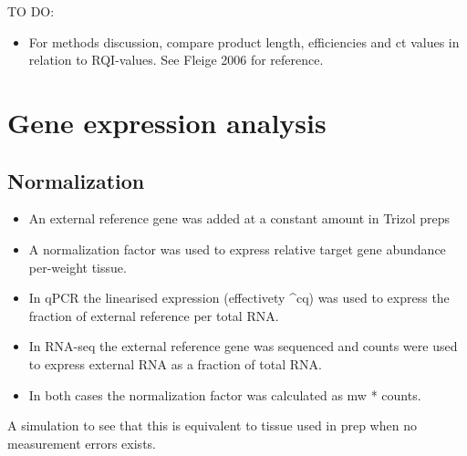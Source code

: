 \documentclass[twoside,10pt]{gihclass} %
\newenvironment{Shaded}{\begin{snugshade}}{\end{snugshade}}
\newcommand{\DataTypeTok}[1]{\textcolor[rgb]{0.13,0.29,0.53}{#1}}
\newcommand{\DecValTok}[1]{\textcolor[rgb]{0.00,0.00,0.81}{#1}}
\newcommand{\FloatTok}[1]{\textcolor[rgb]{0.00,0.00,0.81}{#1}}
\newcommand{\KeywordTok}[1]{\textcolor[rgb]{0.13,0.29,0.53}{\textbf{#1}}}
\newcommand{\NormalTok}[1]{#1}
\newcommand{\OperatorTok}[1]{\textcolor[rgb]{0.81,0.36,0.00}{\textbf{#1}}}
\newcommand{\StringTok}[1]{\textcolor[rgb]{0.31,0.60,0.02}{#1}}
\providecommand{\tightlist}{%
  \setlength{\itemsep}{0pt}\setlength{\parskip}{0pt}}
\begin{document}
TO DO:
\begin{itemize}
\tightlist
\item
  For methods discussion, compare product length, efficiencies and ct values in relation to RQI-values. See Fleige 2006 for reference.
\end{itemize}
\hypertarget{gene-expression-analysis-1}{%
\section{Gene expression analysis}\label{gene-expression-analysis-1}}

\hypertarget{normalization}{%
\subsection{Normalization}\label{normalization}}
\begin{itemize}
\tightlist
\item
  An external reference gene was added at a constant amount in Trizol preps
\item
  A normalization factor was used to express relative target gene abundance per-weight tissue.
\item
  In qPCR the linearised expression (effectivety \^{}cq) was used to express the fraction of external reference per total RNA.
\item
  In RNA-seq the external reference gene was sequenced and counts were used to express external RNA as a fraction of total RNA.
\item
  In both cases the normalization factor was calculated as mw * counts.
\end{itemize}
A simulation to see that this is equivalent to tissue used in prep when no measurement errors exists.
\begin{Shaded}
\end{Shaded}
\end{document}
